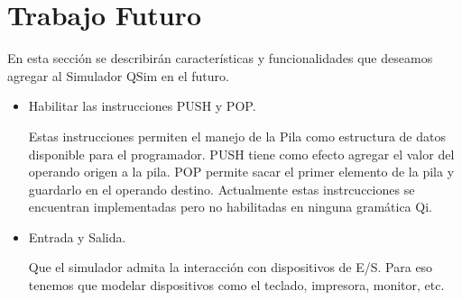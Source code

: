 

\section{Trabajo Futuro}

En esta sección se describirán características y funcionalidades que deseamos agregar al Simulador QSim en el futuro.

\begin{itemize}

\item Habilitar las instrucciones PUSH y POP.

Estas instrucciones permiten el manejo de la Pila como estructura de datos disponible para el programador. 
PUSH tiene como efecto agregar el valor del operando origen a la pila. 
POP permite sacar el primer elemento de la pila y guardarlo en el operando destino.
Actualmente estas instrcucciones se encuentran implementadas pero no habilitadas en ninguna gramática Qi.

\item Entrada y Salida.

Que el simulador admita la interacción con dispositivos de E/S. Para eso tenemos que modelar dispositivos como el teclado, impresora, monitor, etc.

\end{itemize}

